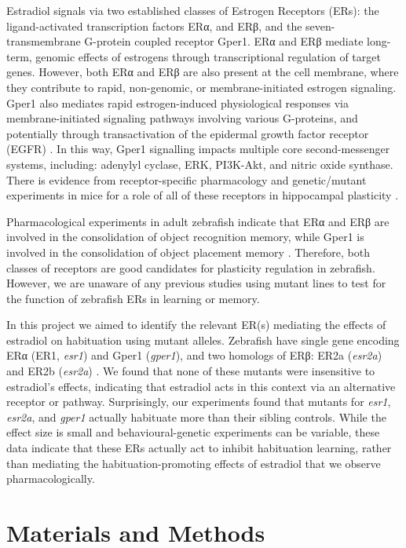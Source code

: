\documentclass[9.5pt,lineno]{RandlettLab_elife}
\begin{document}
Estradiol signals via two established classes of Estrogen Receptors (ERs): the ligand-activated transcription factors ERα, and ERβ, and the seven-transmembrane G-protein coupled receptor Gper1.
ERα and ERβ mediate long-term, genomic effects of estrogens through transcriptional regulation of target genes. 
However, both ERα and ERβ are also present at the cell membrane, where they contribute to rapid, non-genomic, or membrane-initiated estrogen signaling.
Gper1 also mediates rapid estrogen-induced physiological responses via membrane-initiated signaling pathways involving various G-proteins, and potentially through transactivation of the epidermal growth factor receptor (EGFR) \citep{Prossnitz2023-uo, Revankar2005-ww, Filardo2000-yz}.
In this way, Gper1 signalling impacts multiple core second-messenger systems, including: adenylyl cyclase, ERK, PI3K-Akt, and nitric oxide synthase. 
There is evidence from receptor-specific pharmacology and genetic/mutant experiments in mice for a role of all of these receptors in hippocampal plasticity \citep{Finney2020-ng, Koitmae2023-vm, Briz2015-yt}. 

Pharmacological experiments in adult zebrafish indicate that ERα and ERβ are involved in the consolidation of object recognition memory, while Gper1 is involved in the consolidation of object placement memory \citep{Naderi2020-cg}. 
Therefore, both classes of receptors are good candidates for plasticity regulation in zebrafish. However, we are unaware of any previous studies using mutant lines to test for the function of zebrafish ERs in learning or memory. 

In this project we aimed to identify the relevant ER(s) mediating the effects of estradiol on habituation using mutant alleles.
Zebrafish have single gene encoding ERα (ER1, \emph{esr1}) and Gper1 (\emph{gper1}), and two homologs of ERβ: ER2a (\emph{esr2a}) and ER2b (\emph{esr2a})  \citep{Romano2017-ep, Menuet2002-fo}.  
We found that none of these mutants were insensitive to estradiol's effects, indicating that estradiol acts in this context via an alternative receptor or pathway. 
Surprisingly, our experiments found that mutants for \emph{esr1}, \emph{esr2a}, and \emph{gper1} actually habituate more than their sibling controls. 
While the effect size is small and behavioural-genetic experiments can be variable, these data indicate that these ERs actually act to inhibit habituation learning, rather than mediating the habituation-promoting effects of estradiol that we observe pharmacologically. 

\section{Materials and Methods}
\end{document}

